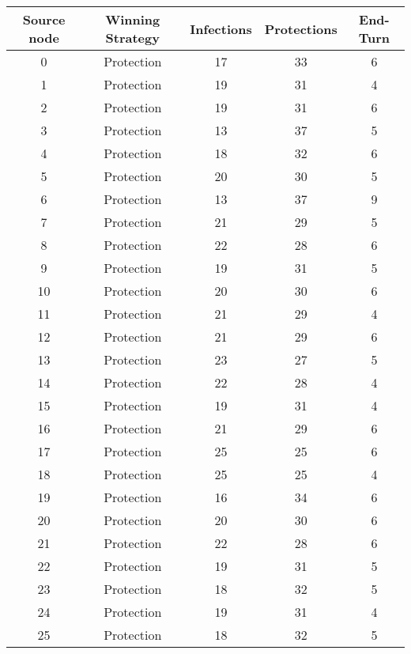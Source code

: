 \documentclass[results.tex]{subfiles}
\begin{document}
\begin{center}
  \begin{tabular}{| c || c | c | c | c |}
    \hline
    {\bfseries Source node} & {\bfseries Winning Strategy} & {\bfseries Infections} & {\bfseries Protections} & {\bfseries End-Turn} \\  %
    \hline\hline
    0 & Protection & 17 & 33 & 6 \\ 
    \hline
    1 & Protection & 19 & 31 & 4 \\ 
    \hline
    2 & Protection & 19 & 31 & 6 \\ 
    \hline
    3 & Protection & 13 & 37 & 5 \\ 
    \hline
    4 & Protection & 18 & 32 & 6 \\ 
    \hline
    5 & Protection & 20 & 30 & 5 \\ 
    \hline
    6 & Protection & 13 & 37 & 9 \\ 
    \hline
    7 & Protection & 21 & 29 & 5 \\ 
    \hline
    8 & Protection & 22 & 28 & 6 \\ 
    \hline
    9 & Protection & 19 & 31 & 5 \\ 
    \hline
    10 & Protection & 20 & 30 & 6 \\ 
    \hline
    11 & Protection & 21 & 29 & 4 \\ 
    \hline
    12 & Protection & 21 & 29 & 6 \\ 
    \hline
    13 & Protection & 23 & 27 & 5 \\ 
    \hline
    14 & Protection & 22 & 28 & 4 \\ 
    \hline
    15 & Protection & 19 & 31 & 4 \\ 
    \hline
    16 & Protection & 21 & 29 & 6 \\ 
    \hline
    17 & Protection & 25 & 25 & 6 \\ 
    \hline
    18 & Protection & 25 & 25 & 4 \\ 
    \hline
    19 & Protection & 16 & 34 & 6 \\ 
    \hline
    20 & Protection & 20 & 30 & 6 \\ 
    \hline
    21 & Protection & 22 & 28 & 6 \\ 
    \hline
    22 & Protection & 19 & 31 & 5 \\ 
    \hline
    23 & Protection & 18 & 32 & 5 \\ 
    \hline
    24 & Protection & 19 & 31 & 4 \\ 
    \hline
    25 & Protection & 18 & 32 & 5 \\ 

\end{tabular}
\end{center}
\end{document}
